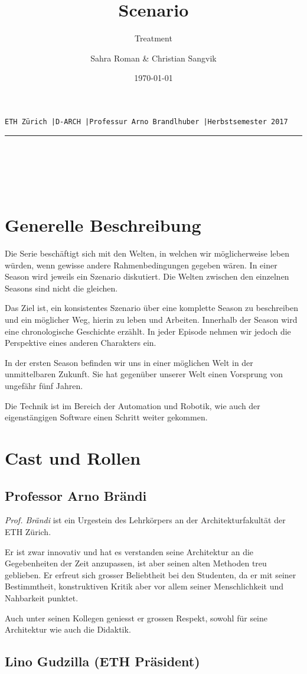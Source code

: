 \documentclass[11pt,a4paper,ngerman]{scrreprt}
\author{Sahra Roman \& Christian Sangvik}
\date{\today}
\title{Scenario}
\subtitle{Treatment}
\makeatletter
\newcommand{\linia}{\rule{.8\textwidth}{.1pt}}
\renewcommand{\maketitle}{
  \begin{center}
        \uppercase{\texttt{\tiny{ETH Zürich
          \enspace{}|\enspace{}D-ARCH
          \enspace{}|\enspace{}Professur Arno Brandlhuber
          \enspace{}|\enspace{}Herbstsemester 2017}}}\\ \linia{}\\
          \vspace*{7cm} \uppercase{\Huge{\MakeUppercase{\@title}}}\\
          \vspace*{2cm} \uppercase{\LARGE{\MakeUppercase{\@subtitle}}}\\
          \vspace*{4cm} \uppercase{\large{\MakeUppercase{\@author}}}\\
        \clearpage
      \end{center}
  }
\makeatother
\begin{document}
\maketitle

\chapter*{Generelle Beschreibung}

Die Serie beschäftigt sich mit den Welten, in welchen wir
möglicherweise leben würden, wenn gewisse andere Rahmenbedingungen gegeben
wären. In einer Season wird jeweils ein Szenario diskutiert. Die Welten
zwischen den einzelnen Seasons sind nicht die gleichen.

Das Ziel ist, ein konsistentes Szenario über eine komplette Season zu
beschreiben und ein möglicher Weg, hierin zu leben und Arbeiten. Innerhalb der
Season wird eine chronologische Geschichte erzählt. In jeder Episode nehmen
wir jedoch die Perspektive eines anderen Charakters ein.

In der ersten Season befinden wir uns in einer möglichen Welt in der
unmittelbaren Zukunft. Sie hat gegenüber unserer Welt einen Vorsprung von
ungefähr fünf Jahren.

Die Technik ist im Bereich der Automation und Robotik, wie auch der
eigenstängigen Software einen Schritt weiter gekommen.

\chapter*{Cast und Rollen}
\section*{Professor Arno Brändi}

\emph{Prof. Brändi} ist ein Urgestein des Lehrkörpers an der Architekturfakultät
der ETH Zürich.

Er ist zwar innovativ und hat es verstanden seine Architektur an die
Gegebenheiten der Zeit anzupassen, ist aber seinen alten Methoden treu
geblieben. Er erfreut sich grosser Beliebtheit bei den Studenten, da er mit
seiner Bestimmtheit, konstruktiven Kritik aber vor allem seiner
Menschlichkeit und Nahbarkeit punktet.

Auch unter seinen Kollegen geniesst er grossen Respekt, sowohl für seine
Architektur wie auch die Didaktik.

\section*{Lino Gudzilla (ETH Präsident)}
\end{document}
